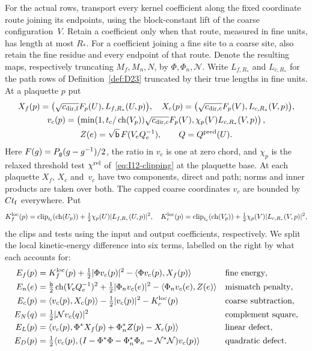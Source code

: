For the actual rows, transport every kernel coefficient along the fixed coordinate route joining its endpoints, using the block-constant lift of the coarse configuration~$V$. Retain a coefficient only when that route, measured in fine units, has length at most $R_*$. For a coefficient joining a fine site to a coarse site, also retain the fine residue and every endpoint of that route. Denote the resulting maps, respectively truncating $M_f,M_n,N$, by $\Phi,\Phi_n,\mathcal N$. Write $L_{f,R_*}$ and $L_{c,R_*}$ for the path rows of Definition~\ref{def:D23} truncated by their true lengths in fine units. At a plaquette $p$ put
\begin{gather*}
X_f(p)=\bigl(\sqrt{c_{{\rm dir},{\rm f}}}F_p(U),L_{f,R_*}(U,p)\bigr),\quad
X_c(p)=\bigl(\sqrt{c_{{\rm dir},{\rm c}}}F_p(V),L_{c,R_*}(V,p)\bigr),\\
v_c(p)=\left(\min(1,t_{\rm c}/\operatorname{ch}(V_p))\sqrt{c_{{\rm dir},{\rm c}}}F_p(V),
\chi_p(V)L_{c,R_*}(V,p)\right),\\
Z(e)=\sqrt{\mathsf{b}}\,F(V_eQ_e^{-1}),\qquad Q=Q^{\rm pred}(U).
\end{gather*}
Here $F(g)=P_{\mathfrak{g}}(g-g^{-1})/2$, the ratio in $v_c$ is one at zero chord, and $\chi_p$ is the relaxed threshold test $\chi^{\rm rel}$ of~\eqref{eq:I12-clipping} at the plaquette base. At each plaquette $X_f$, $X_c$ and~$v_c$ have two components, direct and path; norms and inner products are taken over both. The capped coarse coordinates $v_c$ are bounded by $Ct_{\rm f}$ everywhere. Put
\begin{equation*}
K^{\rm loc}_f(p)=\operatorname{clip}_{t_{\rm f}}(\operatorname{ch}(U_p))+\tfrac12\chi_p(U)|L_{f,R_*}(U,p)|^2,
\quad K^{\rm loc}_c(p)=\operatorname{clip}_{t_{\rm c}}(\operatorname{ch}(V_p))+\tfrac12\chi_p(V)|L_{c,R_*}(V,p)|^2,
\end{equation*}
the clips and tests using the input and output coefficients, respectively. We split the local kinetic-energy difference into six terms, labelled on the right by what each accounts for:
\begin{align*}
E_f(p)&=K^{\rm loc}_f(p)+\tfrac12|\Phi v_c(p)|^2-\langle\Phi v_c(p),X_f(p)\rangle
 &&\text{fine energy},\\
E_n(e)&=\tfrac{\mathsf{b}}2\operatorname{ch}(V_eQ_e^{-1})^2
 +\tfrac12|\Phi_nv_c(e)|^2-\langle\Phi_nv_c(e),Z(e)\rangle
 &&\text{mismatch penalty},\\
E_c(p)&=\langle v_c(p),X_c(p)\rangle-\tfrac12|v_c(p)|^2-K^{\rm loc}_c(p)
 &&\text{coarse subtraction},\\
E_N(q)&=\tfrac12|\mathcal Nv_c(q)|^2
 &&\text{complement square},\\
E_L(p)&=\langle v_c(p),\Phi^*X_f(p)+\Phi_n^*Z(p)-X_c(p)\rangle
 &&\text{linear defect},\\
E_D(p)&=\tfrac12\langle v_c(p),(I-\Phi^*\Phi-\Phi_n^*\Phi_n-\mathcal N^*\mathcal N)v_c(p)\rangle
 &&\text{quadratic defect}.
\end{align*}

